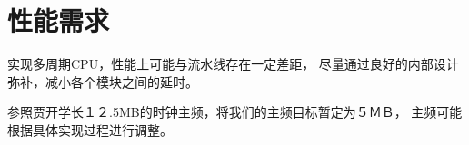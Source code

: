 \section{性能需求}
    实现多周期CPU，性能上可能与流水线存在一定差距，
    尽量通过良好的内部设计弥补，减小各个模块之间的延时。

    参照贾开学长１２.5MB的时钟主频，将我们的主频目标暂定为５ＭＢ，
    主频可能根据具体实现过程进行调整。
